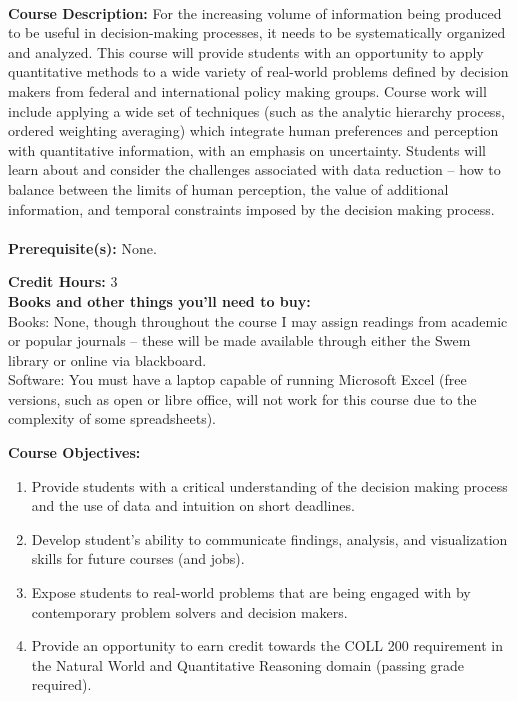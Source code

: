 \documentclass[11pt]{article}
\begin{document}
\textbf {\large \\ Course Description:} For the increasing volume of information being produced to be useful in decision-making processes, it needs to be systematically organized and analyzed. This course will provide students with an opportunity to apply quantitative methods to a wide variety of real-world problems defined by decision makers from federal and international policy making groups. Course work will include applying a wide set of techniques (such as the analytic hierarchy process, ordered weighting averaging) which integrate human preferences and perception with quantitative information, with an emphasis on uncertainty. Students will learn about and consider the challenges associated with data reduction – how to balance between the limits of human perception, the value of additional information, and temporal constraints imposed by the decision making process.  \\
\\
\textbf {Prerequisite(s):} None.

\textbf {Credit Hours:} 3 \\

\textbf {\large Books and other things you'll need to buy:}\\ 

Books: None, though throughout the course I may assign readings from academic or popular journals – these will be made available through either the Swem library or online via blackboard.\\
Software: You must have a laptop capable of running Microsoft Excel (free versions, such as open or libre office, will not work for this course due to the complexity of some spreadsheets).


\vspace{8mm}

\textbf {\large Course Objectives:} 
\begin{enumerate} \itemsep-0.4em
  \item Provide students with a critical understanding of the decision making process and the use of data and intuition on short deadlines.
  \item Develop student’s ability to communicate findings, analysis, and visualization skills for future courses (and jobs).
  \item Expose students to real-world problems that are being engaged with by contemporary problem solvers and decision makers.
  \item Provide an opportunity to earn credit towards the COLL 200 requirement in the Natural World and Quantitative Reasoning domain (passing grade required).
\end{enumerate}
\vspace{8mm}
\end{document}
